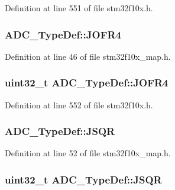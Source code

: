 Definition at line 551 of file stm32f10x.\+h.

\subsubsection[{\texorpdfstring{J\+O\+F\+R4}{JOFR4}}]{ A\+D\+C\+\_\+\+Type\+Def\+::\+J\+O\+F\+R4}\hypertarget{struct_a_d_c___type_def_a28d78f00bedadbd542f2297835b37216}{}\label{struct_a_d_c___type_def_a28d78f00bedadbd542f2297835b37216}


Definition at line 46 of file stm32f10x\+\_\+map.\+h.

\subsubsection[{\texorpdfstring{J\+O\+F\+R4}{JOFR4}}]{ {\bf uint32\+\_\+t} A\+D\+C\+\_\+\+Type\+Def\+::\+J\+O\+F\+R4}\hypertarget{struct_a_d_c___type_def_a92f5c1a5aaa8b286317f923482e09d35}{}\label{struct_a_d_c___type_def_a92f5c1a5aaa8b286317f923482e09d35}


Definition at line 552 of file stm32f10x.\+h.

\subsubsection[{\texorpdfstring{J\+S\+QR}{JSQR}}]{ A\+D\+C\+\_\+\+Type\+Def\+::\+J\+S\+QR}\hypertarget{struct_a_d_c___type_def_a41ab45443a228acca7e0d79cbc24a063}{}\label{struct_a_d_c___type_def_a41ab45443a228acca7e0d79cbc24a063}


Definition at line 52 of file stm32f10x\+\_\+map.\+h.

\subsubsection[{\texorpdfstring{J\+S\+QR}{JSQR}}]{ {\bf uint32\+\_\+t} A\+D\+C\+\_\+\+Type\+Def\+::\+J\+S\+QR}\hypertarget{struct_a_d_c___type_def_a5438a76a93ac1bd2526e92ef298dc193}{}\label{struct_a_d_c___type_def_a5438a76a93ac1bd2526e92ef298dc193}


